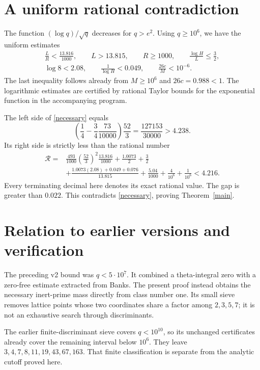 \documentclass[11pt]{article}
\begin{document}
\section{A uniform rational contradiction}

The function \((\log q)/\sqrt q\) decreases for \(q>e^2\).
Using \(q\ge10^6\), we have the uniform estimates
\[
 \begin{gathered}
 \frac LR<\frac{13.816}{1000},\qquad L>13.815,\qquad R\ge1000,\qquad
 \frac{\log H}{L}\le\frac32,\\
 \log8<2.08,\qquad \frac1{\log H}<0.049,\qquad
 \frac{26c}{M}<10^{-6}.
 \end{gathered}
\]
The last inequality follows already from \(M\ge10^6\) and
\(26c=0.988<1\). The logarithmic estimates are certified by rational
Taylor bounds for the exponential function in the accompanying program.

The left side of \eqref{necessary} equals
\[
 \left(\frac14-\frac34\frac{73}{10000}\right)\frac{52}{3}
                  =\frac{127153}{30000}>4.238.
\]
Its right side is strictly less than the rational number
\begin{align*}
 \mathcal R={}&\frac{493}{1000}\left(\frac{52}{3}\right)^2
                       \frac{13.816}{1000}
             +\frac{1.0073}{2}+\frac32\\
 &+\frac{1.0073(2.08)+0.049+0.076}{13.815}
             +\frac{5.04}{1000}+\frac4{10^6}+\frac1{10^6}
             <4.216.
\end{align*}
Every terminating decimal here denotes its exact rational value.
The gap is greater than \(0.022\). This contradicts
\eqref{necessary}, proving Theorem~\ref{main}.

\clearpage
\section{Relation to earlier versions and verification}

The preceding v2 bound was \(q<5\cdot10^7\). It combined a theta-integral
zero with a zero-free estimate extracted from Banks. The present proof
instead obtains the necessary inert-prime mass directly from class
number one. Its small sieve removes lattice points whose two coordinates
share a factor among \(2,3,5,7\); it is not an exhaustive search through
discriminants.

The earlier finite-discriminant sieve covers \(q<10^{10}\), so its
unchanged certificates already cover the remaining interval below
\(10^6\). They leave \(3,4,7,8,11,19,43,67,163\). That finite
classification is separate from the analytic cutoff proved here.
\end{document}
